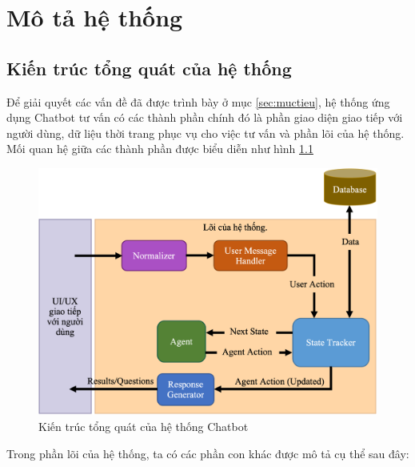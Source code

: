 \chapter{Mô tả hệ thống}

\section{Kiến trúc tổng quát của hệ thống}
Để giải quyết các vấn đề đã được trình bày ở mục \ref{sec:muctieu},
hệ thống ứng dụng Chatbot tư vấn có các thành phần chính đó là phần
giao diện giao tiếp với người dùng, dữ liệu thời trang phục vụ cho
việc tư vấn và phần lõi của hệ thống. Mối quan hệ giữa các thành phần
được biểu diễn như hình \ref{fig:chatbotapp}

\begin{figure}[ht!]
    \centering
    \includegraphics[scale=0.95]{thesis/chatbot/phuongphap/img/chatbot_app.png}
    \caption{Kiến trúc tổng quát của hệ thống Chatbot}
    \label{fig:chatbotapp}
\end{figure}

Trong phần lõi của hệ thống, ta có các phần con khác được mô tả
cụ thể sau đây:

